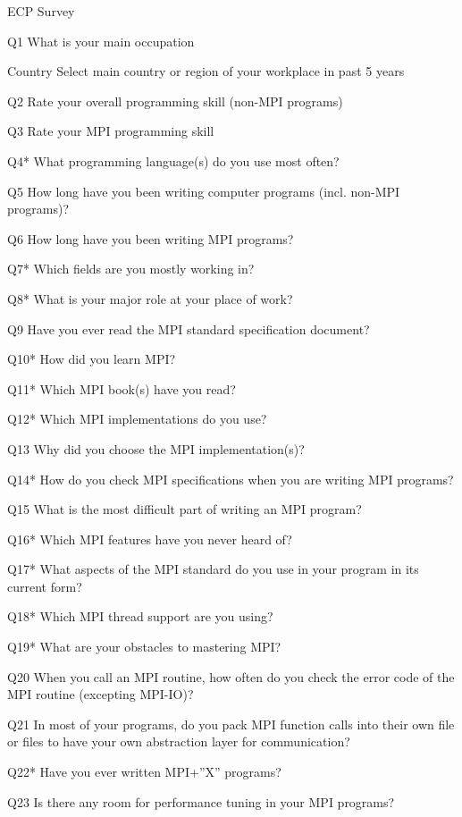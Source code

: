 
ECP Survey\cite{osti_1462877}

\begin{description}
\item{Q1} What is your main occupation
\item{Country} Select main country or region of your workplace in past 5 years
\item{Q2} Rate your overall programming skill (non-MPI programs)
\item{Q3} Rate your MPI programming skill
\item{Q4*} What programming language(s) do you use most often?
\item{Q5} How long have you been writing computer programs (incl. non-MPI programs)?
\item{Q6} How long have you been writing MPI programs?
\item{Q7*} Which fields are you mostly working in?
\item{Q8*} What is your major role at your place of work?
\item{Q9} Have you ever read the MPI standard specification document?
\item{Q10*} How did you learn MPI?
\item{Q11*} Which MPI book(s) have you read?
\item{Q12*} Which MPI implementations do you use?
\item{Q13} Why did you choose the MPI implementation(s)?
\item{Q14*} How do you check MPI specifications when you are writing MPI programs?
\item{Q15} What is the most difficult part of writing an MPI program?
\item{Q16*} Which MPI features have you never heard of?
\item{Q17*} What aspects of the MPI standard do you use in your program in its current form?
\item{Q18*} Which MPI thread support are you using?
\item{Q19*} What are your obstacles to mastering MPI?
\item{Q20} When you call an MPI routine, how often do you check the error code of the MPI routine  (excepting MPI-IO)?
\item{Q21} In most of your programs, do you pack MPI function calls into their own file or files to have your own abstraction layer for communication?
\item{Q22*} Have you ever written MPI+”X” programs?
\item{Q23} Is there any room for performance tuning in your MPI programs?

\end{description}
